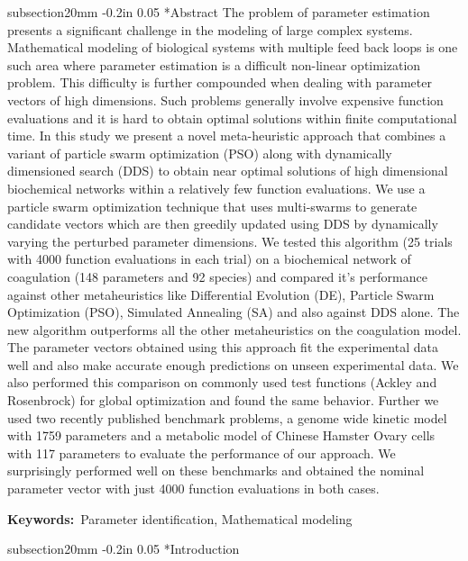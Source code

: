 \documentclass[12pt]{article}
\makeatletter
\renewcommand\section{\@startsection
	{subsection}{2}{0mm}
	{-0.2in}
	{0.05\baselineskip}
	{\normalfont\large\bfseries}}
\makeatother
\begin{document}
\section*{Abstract}
The problem of parameter estimation presents a significant challenge in the modeling of large complex systems. Mathematical modeling of biological systems with multiple feed back loops is one such area where parameter estimation is a difficult non-linear optimization problem. This difficulty is further compounded when dealing with parameter vectors of high dimensions. Such problems generally involve expensive function evaluations and it is hard to obtain optimal solutions within finite computational time. In this study we present a novel meta-heuristic approach that combines a variant of particle swarm optimization (PSO) along with dynamically dimensioned search (DDS) to obtain near optimal solutions of high dimensional biochemical networks within a relatively few function evaluations. We use a particle swarm optimization technique that uses multi-swarms to generate candidate vectors which are then greedily updated using DDS by dynamically varying the perturbed parameter dimensions. We tested this algorithm (25 trials with 4000 function evaluations in each trial) on a biochemical network of coagulation (148 parameters and 92 species) and compared it's performance against other metaheuristics like Differential Evolution (DE), Particle Swarm Optimization (PSO), Simulated Annealing (SA) and also against DDS alone. The new algorithm outperforms all the other metaheuristics on the coagulation model. The parameter vectors obtained using this approach fit the experimental data well and also make accurate enough predictions on unseen experimental data. We also performed this comparison on commonly used test functions (Ackley and Rosenbrock) for global optimization and found the same behavior. Further we used two recently published benchmark problems, a genome wide kinetic model with 1759 parameters and a metabolic model of Chinese Hamster Ovary cells with 117 parameters to evaluate the performance of our approach. We  surprisingly performed well on these benchmarks and obtained the nominal parameter vector with just 4000 function evaluations in both cases. 

{\noindent \textbf{Keywords:}~Parameter identification, Mathematical modeling}

\pagebreak

\setcounter{page}{1}

\linenumbers

\section*{Introduction}
\end{document}
